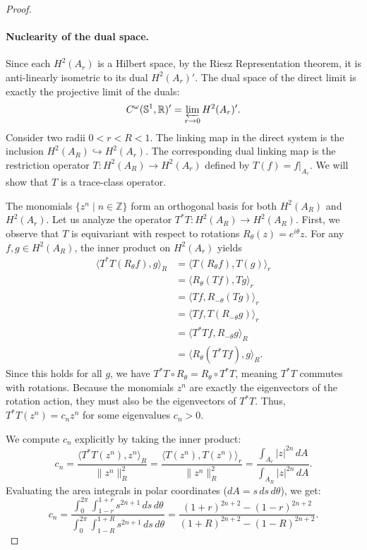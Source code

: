 \documentclass[11pt,reqno]{amsart}
\theoremstyle{definition}
\numberwithin{equation}{section}
\begin{document}
\begin{proof}
\paragraph{Nuclearity of the dual space.}
Since each $H^2(A_r)$ is a Hilbert space, by the Riesz Representation theorem, it is anti-linearly isometric to its dual $H^2(A_r)'$. The dual space of the direct limit is exactly the projective limit of the duals:
\[
C^{\omega}(\mathbb{S}^1, \mathbb{R})' = \varprojlim_{r \to 0} H^2(A_r)'.
\]
Consider two radii $0 < r < R < 1$. The linking map in the direct system is the inclusion $H^2(A_R) \hookrightarrow H^2(A_r)$. The corresponding dual linking map is the restriction operator $T : H^2(A_R) \rightarrow H^2(A_r)$ defined by $T(f) = f|_{A_r}$. We will show that $T$ is a trace-class operator.

The monomials $\{z^n \mid n \in \mathbb{Z}\}$ form an orthogonal basis for both $H^2(A_R)$ and $H^2(A_r)$. Let us analyze the operator $T^*T : H^2(A_R) \to H^2(A_R)$. First, we observe that $T$ is equivariant with respect to rotations $R_\theta(z) = e^{i\theta}z$. For any $f, g \in H^2(A_R)$, the inner product on $H^2(A_r)$ yields
\begin{align*}
\langle T^*T (R_\theta f), g \rangle_R &= \langle T(R_\theta f), T(g) \rangle_r \\
&= \langle R_\theta (Tf), Tg \rangle_r \\
&= \langle Tf, R_{-\theta} (Tg) \rangle_r \\
&= \langle Tf, T(R_{-\theta} g) \rangle_r \\
&= \langle T^*T f, R_{-\theta} g \rangle_R \\
&= \langle R_\theta (T^*T f), g \rangle_R.
\end{align*}
Since this holds for all $g$, we have $T^*T \circ R_\theta = R_\theta \circ T^*T$, meaning $T^*T$ commutes with rotations. Because the monomials $z^n$ are exactly the eigenvectors of the rotation action, they must also be the eigenvectors of $T^*T$. Thus, $T^*T(z^n) = c_n z^n$ for some eigenvalues $c_n > 0$.

We compute $c_n$ explicitly by taking the inner product:
\[
c_n = \frac{\langle T^*T(z^n), z^n \rangle_R}{\|z^n\|^2_R} = \frac{\langle T(z^n), T(z^n) \rangle_r}{\|z^n\|^2_R} = \frac{\int_{A_r} |z|^{2n} \, dA}{\int_{A_R} |z|^{2n} \, dA}.
\]
Evaluating the area integrals in polar coordinates ($dA = s \, ds \, d\theta$), we get:
\[
c_n = \frac{\int_0^{2\pi} \int_{1-r}^{1+r} s^{2n+1} \, ds \, d\theta}{\int_0^{2\pi} \int_{1-R}^{1+R} s^{2n+1} \, ds \, d\theta} = \frac{(1+r)^{2n+2} - (1-r)^{2n+2}}{(1+R)^{2n+2} - (1-R)^{2n+2}}.
\]


\end{proof}
\end{document}
